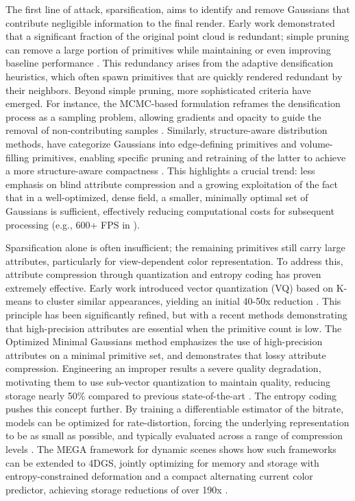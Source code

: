 \documentclass[11pt,a4paper]{article}
\begin{document}
The first line of attack, sparsification, aims to identify and remove Gaussians that contribute negligible information to the final render. Early work demonstrated that a significant fraction of the original point cloud is redundant; simple pruning can remove a large portion of primitives while maintaining or even improving baseline performance \cite{arxiv:2412.00578v3,arxiv:2410.23213v1}. This redundancy arises from the adaptive densification heuristics, which often spawn primitives that are quickly rendered redundant by their neighbors. Beyond simple pruning, more sophisticated criteria have emerged. For instance, the MCMC-based formulation reframes the densification process as a sampling problem, allowing gradients and opacity to guide the removal of non-contributing samples \cite{arxiv:2404.09591v3}. Similarly, structure-aware distribution methods, have categorize Gaussians into edge-defining primitives and volume-filling primitives, enabling specific pruning and retraining of the latter to achieve a more structure-aware compactness \cite{arxiv:2501.13045v1}. This highlights a crucial trend: less emphasis on blind attribute compression and a growing exploitation of the fact that in a well-optimized, dense field, a smaller, minimally optimal set of Gaussians is sufficient, effectively reducing computational costs for subsequent processing (e.g., 600+ FPS in \cite{arxiv:2503.16924v2}).

Sparsification alone is often insufficient; the remaining primitives still carry large attributes, particularly for view-dependent color representation. To address this, attribute compression through quantization and entropy coding has proven extremely effective. Early work introduced vector quantization (VQ) based on K-means to cluster similar appearances, yielding an initial 40-50x reduction \cite{arxiv:2311.18159v3}. This principle has been significantly refined, but with a recent methods demonstrating that high-precision attributes are essential when the primitive count is low. The Optimized Minimal Gaussians method emphasizes the use of high-precision attributes on a minimal primitive set, and demonstrates that lossy attribute compression. Engineering an improper results a severe quality degradation, motivating them to use sub-vector quantization to maintain quality, reducing storage nearly 50\% compared to previous state-of-the-art \cite{arxiv:2503.16924v2}. The entropy coding pushes this concept further. By training a differentiable estimator of the bitrate, models can be optimized for rate-distortion, forcing the underlying representation to be as small as possible, and typically evaluated across a range of compression levels \cite{arxiv:2501.13558v3}. The MEGA framework for dynamic scenes shows how such frameworks can be extended to 4DGS, jointly optimizing for memory and storage with entropy-constrained deformation and a compact alternating current color predictor, achieving storage reductions of over 190x \cite{arxiv:2410.13613v3}.
\end{document}
